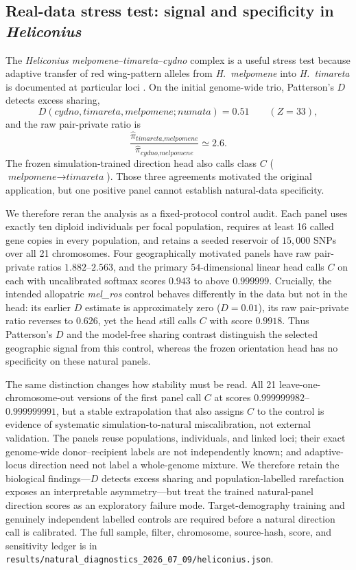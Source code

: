 \documentclass[11pt]{article}
\theoremstyle{plain}
\theoremstyle{definition}
\theoremstyle{remark}
\begin{document}
\subsection{Real-data stress test: signal and specificity in \textit{Heliconius}}
\label{subsec:heliconius}

The \textit{Heliconius melpomene}--\textit{timareta}--\textit{cydno} complex is a useful stress
test because adaptive transfer of red wing-pattern alleles from \textit{H.~melpomene} into
\textit{H.~timareta} is documented at particular loci
\citep{pardodiaz2012adaptive,wallbank2016evolutionary,martin2013speciation}. On the initial
genome-wide trio, Patterson's $D$ detects excess sharing,
\[
D(\textit{cydno},\textit{timareta},\textit{melpomene};\textit{numata})=0.51
\qquad (Z=33),
\]
and the raw pair-private ratio is
\[
\frac{\widehat\pi_{\textit{timareta},\textit{melpomene}}}
     {\widehat\pi_{\textit{cydno},\textit{melpomene}}}\simeq 2.6.
\]
The frozen simulation-trained
direction head also calls class $C$ ($\textit{melpomene}\!\to\!\textit{timareta}$). Those three
agreements motivated the original application, but one positive panel cannot establish natural-data
specificity.

We therefore reran the analysis as a fixed-protocol control audit. Each panel uses exactly ten
diploid individuals per focal population, requires at least 16 called gene copies in every
population, and retains a seeded reservoir of $15{,}000$ SNPs over all 21 chromosomes. Four
geographically motivated panels have raw pair-private ratios $1.882$--$2.563$, and the primary
$54$-dimensional linear head calls $C$ on each with uncalibrated softmax scores
$0.943$ to above $0.999999$. Crucially, the intended allopatric \textit{mel\_ros} control behaves
differently in the data but not in the head: its earlier $D$ estimate is approximately zero
($D=0.01$), its raw pair-private ratio reverses to $0.626$, yet the head still calls $C$ with score
$0.9918$. Thus Patterson's $D$ and the model-free sharing contrast distinguish the selected
geographic signal from this control, whereas the frozen orientation head has no specificity on
these natural panels.

The same distinction changes how stability must be read. All 21 leave-one-chromosome-out versions
of the first panel call $C$ at scores $0.999999982$--$0.999999991$, but a stable extrapolation that
also assigns $C$ to the control is evidence of systematic simulation-to-natural miscalibration, not
external validation. The panels reuse populations, individuals, and linked loci; their exact
genome-wide donor--recipient labels are not independently known; and adaptive-locus direction need
not label a whole-genome mixture. We therefore retain the biological findings---$D$ detects excess
sharing and population-labelled rarefaction exposes an interpretable asymmetry---but treat the
trained natural-panel direction scores as an exploratory failure mode. Target-demography training
and genuinely independent labelled controls are required before a natural direction call is
calibrated. The full sample, filter, chromosome, source-hash, score, and sensitivity ledger is in
\texttt{results/natural\_diagnostics\_2026\_07\_09/heliconius.json}.
\end{document}
